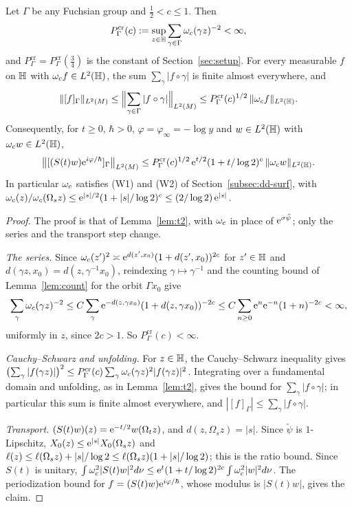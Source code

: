\begin{proposition}\label{os:p1}
Let $\Gamma$ be any Fuchsian group and $\tfrac12<c\le1$. Then
\[
  P^{\mathrm{cr}}_\Gamma(c):=\sup_{z\in\mathbb{H}}\sum_{\gamma\in\Gamma}\omega_c(\gamma z)^{-2}<\infty ,
\]
and $P^{\mathrm{cr}}_\Gamma=P^{\mathrm{cr}}_\Gamma(\tfrac34)$ is the constant of Section~\ref{sec:setup}. For every measurable $f$ on $\mathbb{H}$ with
$\omega_c f\in L^2(\mathbb{H})$, the sum $\sum_\gamma|f\circ\gamma|$ is finite almost everywhere, and
\[
  \lVert [f]_\Gamma\rVert_{L^2(M)}\le\Bigl\|\sum_{\gamma\in\Gamma}|f\circ\gamma|\Bigr\|_{L^2(M)}\le P^{\mathrm{cr}}_\Gamma(c)^{1/2}\,\lVert \omega_c f\rVert_{L^2(\mathbb{H})} .
\]
Consequently, for $t\ge0$, $\hbar>0$, $\varphi=\varphi_\infty=-\log y$ and $w\in L^2(\mathbb{H})$ with $\omega_c w\in L^2(\mathbb{H})$,
\[
\bigl\|[(S(t)w)\mathrm{e}^{i\varphi/\hbar}]_\Gamma\bigr\|_{L^2(M)}\le P^{\mathrm{cr}}_\Gamma(c)^{1/2}\,\mathrm{e}^{t/2}(1+t/\log2)^{c}\,\|\omega_c w\|_{L^2(\mathbb{H})}.
\]
In particular $\omega_c$ satisfies \textup{(W1)} and \textup{(W2)} of Section~\ref{subsec:dd-surf}, with
$\omega_c(z)/\omega_c(\Omega_sz)\le\mathrm{e}^{|s|/2}(1+|s|/\log2)^{c}\le(2/\log2)\,\mathrm{e}^{|s|}$.
\end{proposition}
\begin{proof}
The proof is that of Lemma~\ref{lem:t2}, with $\omega_c$ in place of $\mathrm{e}^{\sigma\tilde\psi}$; only the series and the transport step change.

\emph{The series.} Since $\omega_c(z')^2\asymp\mathrm{e}^{d(z',x_0)}(1+d(z',x_0))^{2c}$ for $z'\in\mathbb{H}$ and $d(\gamma z,x_0)=d(z,\gamma^{-1}x_0)$,
reindexing $\gamma\mapsto\gamma^{-1}$ and the counting bound of Lemma~\ref{lem:count} for the orbit $\Gamma x_0$ give
\[
\sum_\gamma\omega_c(\gamma z)^{-2}\le C\sum_\gamma\mathrm{e}^{-d(z,\gamma x_0)}(1+d(z,\gamma x_0))^{-2c}\le C\sum_{n\ge0}\mathrm{e}^{n}\mathrm{e}^{-n}(1+n)^{-2c}<\infty,
\]
uniformly in $z$, since $2c>1$. So $P^{\mathrm{cr}}_\Gamma(c)<\infty$.

\emph{Cauchy--Schwarz and unfolding.} For $z\in\mathbb{H}$, the Cauchy--Schwarz inequality gives
$\bigl(\sum_\gamma|f(\gamma z)|\bigr)^2\le P^{\mathrm{cr}}_\Gamma(c)\sum_\gamma\omega_c(\gamma z)^2|f(\gamma z)|^2$. Integrating over a fundamental domain and
unfolding, as in Lemma~\ref{lem:t2}, gives the bound for $\sum_\gamma|f\circ\gamma|$; in particular this sum is finite almost everywhere,
and $|[f]_\Gamma|\le\sum_\gamma|f\circ\gamma|$.

\emph{Transport.} $(S(t)w)(z)=\mathrm{e}^{-t/2}w(\Omega_tz)$, and $d(z,\Omega_sz)=|s|$. Since $\tilde\psi$ is $1$-Lipschitz, $X_0(z)\le\mathrm{e}^{|s|}X_0(\Omega_sz)$ and
$\ell(z)\le\ell(\Omega_sz)+|s|/\log2\le\ell(\Omega_sz)(1+|s|/\log2)$; this is the ratio bound. Since $S(t)$ is unitary,
$\int\omega_c^2|S(t)w|^2d\nu\le\mathrm{e}^{t}(1+t/\log2)^{2c}\int\omega_c^2|w|^2d\nu$. The periodization bound for $f=(S(t)w)\mathrm{e}^{i\varphi/\hbar}$,
whose modulus is $|S(t)w|$, gives the claim.
\end{proof}


